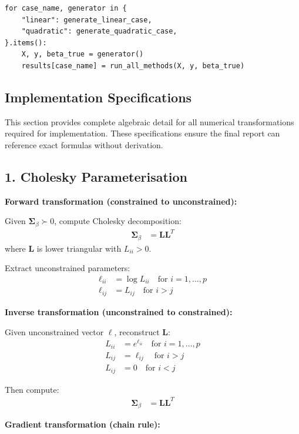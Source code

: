 \documentclass[11pt,a4paper]{article}
\begin{document}
\begin{verbatim}
for case_name, generator in {
    "linear": generate_linear_case,
    "quadratic": generate_quadratic_case,
}.items():
    X, y, beta_true = generator()
    results[case_name] = run_all_methods(X, y, beta_true)
\end{verbatim}
\subsection{Implementation Specifications}

This section provides complete algebraic detail for all numerical transformations required for implementation. These specifications ensure the final report can reference exact formulas without derivation.

\subsection*{1. Cholesky Parameterisation}

\textbf{Forward transformation (constrained to unconstrained):}

Given $\bm{\Sigma}_\beta \succ 0$, compute Cholesky decomposition:
\begin{align}
\bm{\Sigma}_\beta &= \bm{L}\bm{L}^T
\end{align}
where $\bm{L}$ is lower triangular with $L_{ii} > 0$.

Extract unconstrained parameters:
\begin{align}
\ell_{ii} &= \log L_{ii} \quad \text{for } i=1,\ldots,p\\
\ell_{ij} &= L_{ij} \quad \text{for } i > j
\end{align}

\textbf{Inverse transformation (unconstrained to constrained):}

Given unconstrained vector $\bm{\ell}$, reconstruct $\bm{L}$:
\begin{align}
L_{ii} &= e^{\ell_{ii}} \quad \text{for } i=1,\ldots,p\\
L_{ij} &= \ell_{ij} \quad \text{for } i > j\\
L_{ij} &= 0 \quad \text{for } i < j
\end{align}

Then compute:
\begin{align}
\bm{\Sigma}_\beta &= \bm{L}\bm{L}^T
\end{align}

\textbf{Gradient transformation (chain rule):}
\end{document}
